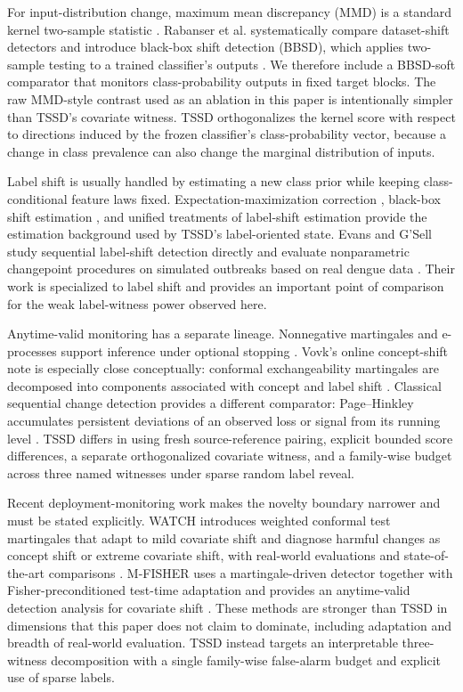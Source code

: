 \documentclass[11pt,a4paper]{article}
\theoremstyle{definition}
\newcommand{\1}{\mathbf{1}}
\begin{document}
For input-distribution change, maximum mean discrepancy (MMD) is a standard kernel two-sample statistic \cite{gretton2012}. Rabanser et al. systematically compare dataset-shift detectors and introduce black-box shift detection (BBSD), which applies two-sample testing to a trained classifier's outputs \cite{rabanser2019}. We therefore include a BBSD-soft comparator that monitors class-probability outputs in fixed target blocks. The raw MMD-style contrast used as an ablation in this paper is intentionally simpler than TSSD's covariate witness. TSSD orthogonalizes the kernel score with respect to directions induced by the frozen classifier's class-probability vector, because a change in class prevalence can also change the marginal distribution of inputs.

Label shift is usually handled by estimating a new class prior while keeping class-conditional feature laws fixed. Expectation-maximization correction \cite{saerens2002}, black-box shift estimation \cite{lipton2018}, and unified treatments of label-shift estimation \cite{garg2020} provide the estimation background used by TSSD's label-oriented state. Evans and G'Sell study sequential label-shift detection directly and evaluate nonparametric changepoint procedures on simulated outbreaks based on real dengue data \cite{evans2024}. Their work is specialized to label shift and provides an important point of comparison for the weak label-witness power observed here.

Anytime-valid monitoring has a separate lineage. Nonnegative martingales and e-processes support inference under optional stopping \cite{ville1939,howard2020,vovk2021,ramdas2023,waudbysmith2024}. Vovk's online concept-shift note is especially close conceptually: conformal exchangeability martingales are decomposed into components associated with concept and label shift \cite{vovk2020concept}. Classical sequential change detection provides a different comparator: Page--Hinkley accumulates persistent deviations of an observed loss or signal from its running level \cite{page1954}. TSSD differs in using fresh source-reference pairing, explicit bounded score differences, a separate orthogonalized covariate witness, and a family-wise budget across three named witnesses under sparse random label reveal.

Recent deployment-monitoring work makes the novelty boundary narrower and must be stated explicitly. WATCH introduces weighted conformal test martingales that adapt to mild covariate shift and diagnose harmful changes as concept shift or extreme covariate shift, with real-world evaluations and state-of-the-art comparisons \cite{prinster2025watch}. M-FISHER uses a martingale-driven detector together with Fisher-preconditioned test-time adaptation and provides an anytime-valid detection analysis for covariate shift \cite{khan2025mfisher}. These methods are stronger than TSSD in dimensions that this paper does not claim to dominate, including adaptation and breadth of real-world evaluation. TSSD instead targets an interpretable three-witness decomposition with a single family-wise false-alarm budget and explicit use of sparse labels.
\end{document}
